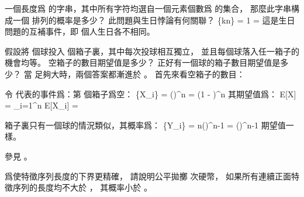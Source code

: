 \startEXERCISE \DIFFICULT
一個長度爲  的字串，其中所有字符均選自一個元素個數爲  的集合，
那麼此字串構成一個  排列的概率是多少？
此問題與生日悖論有何關聯？
\stopEXERCISE
\startANSWER
\startformula
\Pr\{kn\} = 1 \cdot
                                  \cdot
                                  \cdots
      = 
\stopformula
這是生日問題的互補事件，即  個人生日各不相同。
\stopANSWER

\startEXERCISE \DIFFICULT
假設將  個球投入  個箱子裏，其中每次投球相互獨立，
並且每個球落入任一箱子的機會均等。
空箱子的數目期望值是多少？
正好有一個球的箱子數目期望值是多少？
\stopEXERCISE
\startANSWER
當  足夠大時，兩個答案都漸進於 。
首先來看空箱子的數目：

令  代表的事件爲：第  個箱子爲空：
\startformula
\Pr\{X_i\} = \left(\right)^n
                = \left(1 - \right)^n
                \approx {}
\stopformula
其期望值爲：
\startformula
E[X] = \sum_{i=1}^n E[X_i] = 
\stopformula

箱子裏只有一個球的情況類似，其概率爲：
\startformula
\Pr\{Y_i\} = n\left(\right)^{n-1}
                = \left(\right)^{n-1} \approx {}
\stopformula
期望值一樣。

參見 。
\stopANSWER

\startEXERCISE \DIFFICULT
爲使特徵序列長度的下界更精確，
請說明公平拋擲  次硬幣，
如果所有連續正面特徵序列的長度均不大於 ，
其概率小於 。
\stopEXERCISE

\startANSWER
{}
\stopANSWER

\stopsection
